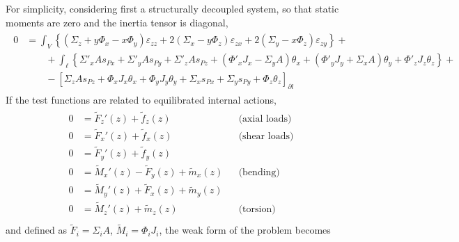 \documentclass[letterpaper,10pt,english]{jupyterBook}
\begin{document}
\sphinxAtStartPar
For simplicity, considering first a structurally decoupled system, so that static moments are zero and the inertia tensor is diagonal,
\begin{equation*}
\begin{split}\begin{aligned}
 0 
 & = \int_V \left\{ ( \Sigma_z + y \Phi_{x} - x \Phi_{y} ) \varepsilon_{zz} + 2 ( \Sigma_x - y \Phi_z ) \varepsilon_{zx} + 2 ( \Sigma_y - x \Phi_z ) \varepsilon_{zy} \right\} + \\
 & \qquad + \int_\ell \left\{ \Sigma'_x A s_{Px} + \Sigma'_y A s_{Py} + \Sigma'_z A s_{Pz} + \left( \Phi'_x J_x - \Sigma_y A \right) \theta_x + ( \Phi'_y J_y + \Sigma_x A ) \theta_y + \Phi'_z J_z \theta_z \right\} + \\
 & \qquad - \left[ \Sigma_z A s_{Pz} + \Phi_x J_x \theta_x + \Phi_y J_y \theta_y + \Sigma_{x} s_{Px} + \Sigma_y s_{Py} + \Phi_z \theta_z \right]_{\partial l}
\end{aligned}\end{split}
\end{equation*}
\sphinxAtStartPar
If the test functions are related to equilibrated internal actions,
\begin{equation*}
\begin{split}\begin{aligned}
  0 & = \widetilde{F}_z'(z) + \widetilde{f}_z(z)                       && \text{(axial loads)} \\
  0 & = \widetilde{F}_x'(z) + \widetilde{f}_x(z)                       && \text{(shear loads)} \\
  0 & = \widetilde{F}_y'(z) + \widetilde{f}_y(z)                       &&                      \\
  0 & = \widetilde{M}_x'(z) - \widetilde{F}_y(z) + \widetilde{m}_x(z)  && \text{(bending)}     \\
  0 & = \widetilde{M}_y'(z) + \widetilde{F}_x(z) + \widetilde{m}_y(z)  &&                      \\
  0 & = \widetilde{M}_z'(z) + \widetilde{m}_z(z)                       && \text{(torsion)}     \\
\end{aligned}\end{split}
\end{equation*}
\sphinxAtStartPar
and defined as \(\widetilde{F}_i = \Sigma_i A\), \(\widetilde{M}_i = \Phi_i J_i\), the weak form of the problem becomes
\end{document}

